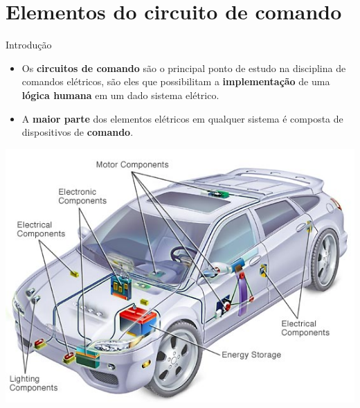 \section{Elementos do circuito de comando}

\begin{frame}{Introdução}
\begin{block}{}
\begin{itemize}
    \item Os \textbf{circuitos de comando }são o principal ponto de estudo na disciplina de comandos elétricos, são eles que possibilitam a \textbf{implementação }de uma \textbf{lógica humana }em um dado sistema elétrico.
    \item A \textbf{maior parte }dos elementos elétricos em qualquer sistema é composta de dispositivos de \textbf{comando}.
\end{itemize}
\end{block}
\centerline{\includegraphics[width=0.5\linewidth]{Figuras/Ch06/fig1.jpg}}
\end{frame}


